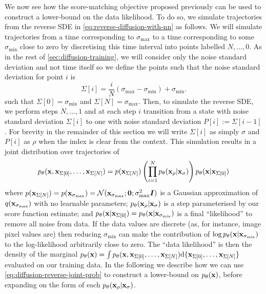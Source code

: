 We now see how the score-matching objective proposed previously can be used to construct a lower-bound on the data likelihood. To do so, we simulate trajectories from the reverse SDE in \cref{eq:reverse-diffusion-with-nn} as follows. We will simulate trajectories from a time corresponding to $\sigma_\text{max}$ to a time corresponding to some $\sigma_\text{min}$ close to zero by discretising this time interval into points labelled $N,\ldots,0$. As in the rest of \cref{sec:diffusion-training}, we will consider only the noise standard deviation and not time itself so we define the points such that the noise standard deviation for point $i$ is
\begin{equation}
    \Sigma[i] = \frac{i}{N}(\sigma_\text{max} - \sigma_\text{min}) + \sigma_\text{min}.
\end{equation}
such that $\Sigma[0] = \sigma_\text{min}$ and $\Sigma[N] = \sigma_\text{max}$. Then, to simulate the reverse SDE, we perform steps $N,\ldots,1$ and at each step $i$ transition from a state with noise standard deviation $\Sigma[i]$ to one with noise standard deviation $P[i] := \Sigma[i-1]$. For brevity in the remainder of this section we will write $\Sigma[i]$ as simply $\sigma$ and $P[i]$ as $\rho$ when the index is clear from the context. This simulation results in a joint distribution over trajectories of
\begin{align} \label{eq:diffusion-reverse-joint-prob}
    p_\theta({\mathbf{x}},{\mathbf{x}}_{\Sigma[0]},\ldots,{\mathbf{x}}_{\Sigma[N]}) = p({\mathbf{x}}_{\Sigma[N]}) \left( \prod_{i=1}^N p_\theta({\mathbf{x}}_{\rho} | {\mathbf{x}}_{\sigma}) \right) p_\theta({\mathbf{x}}|{\mathbf{x}}_{\Sigma[0]})
\end{align}
where $p({\mathbf{x}}_{\Sigma[N]}) = p({\mathbf{x}}_{\sigma_\text{max}}) = {\mathcal{N}}({\mathbf{x}}_{\sigma_\text{max}}; \mathbf{0}; \sigma_\text{max}^2{\bm{I}})$ is a Gaussian approximation of $q({\mathbf{x}}_{\sigma_\text{max}})$ with no learnable parameters; $p_\theta({\mathbf{x}}_{\rho} | {\mathbf{x}}_{\sigma})$ is a step parameterised by our score function estimate; and $p_\theta({\mathbf{x}}|{\mathbf{x}}_{\Sigma[0]}) = p_\theta({\mathbf{x}}|{\mathbf{x}}_{\sigma_\text{min}})$ is a final ``likelihood'' to remove all noise from data. If the data values are discrete (as, for instance, image pixel values are) then reducing $\sigma_\text{min}$ can make the contribution of $\log p_\theta({\mathbf{x}}|{\mathbf{x}}_{\sigma_\text{min}})$ to the log-likelihood arbitrarily close to zero. The ``data likelihood'' is then the density of the marginal $p_\theta({\mathbf{x}}) = \int p_\theta({\mathbf{x}},{\mathbf{x}}_{\Sigma[0]},\ldots,{\mathbf{x}}_{\Sigma[N]}) \mathrm{d}\{{\mathbf{x}}_{\Sigma[0]},\ldots,{\mathbf{x}}_{\Sigma[N]}\}$ evaluated on our training data. In the following we describe how we can use \cref{eq:diffusion-reverse-joint-prob} to construct a lower-bound on $p_\theta({\mathbf{x}})$, before expanding on the form of each $p_\theta({\mathbf{x}}_{\rho}|{\mathbf{x}}_{\sigma})$.

